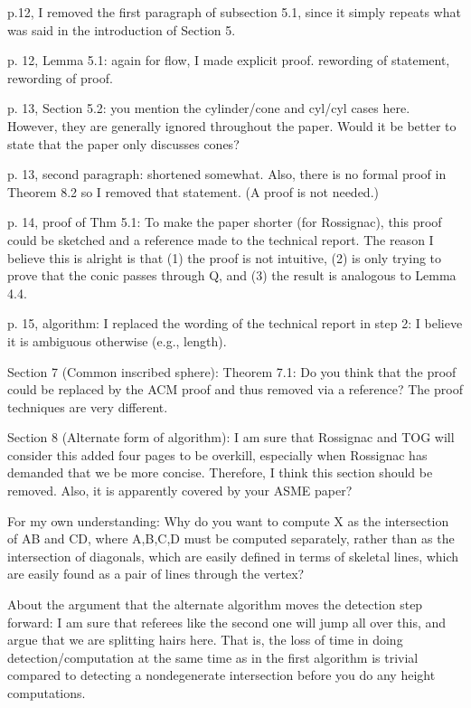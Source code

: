 p.12, I removed the first paragraph of subsection 5.1, since it simply repeats
	what was said in the introduction of Section 5.

p. 12, Lemma 5.1: again for flow, I made explicit proof.
	rewording of statement, rewording of proof.

p. 13, Section 5.2: you mention the cylinder/cone and cyl/cyl cases here.
	However, they are generally ignored throughout the paper.
	Would it be better to state that the paper only discusses cones?

p. 13, second paragraph: shortened somewhat.
	Also, there is no formal proof in Theorem 8.2 so I removed that
	statement.  (A proof is not needed.)

p. 14, proof of Thm 5.1: To make the paper shorter (for Rossignac),
	this proof could be sketched and a reference made to the technical
	report.  The reason I believe this is alright is that
	(1) the proof is not intuitive, (2) is only trying to prove that
	the conic passes through Q, and (3) the result is analogous to 
	Lemma 4.4.

p. 15, algorithm: I replaced the wording of the technical report in step 2:
	I believe it is ambiguous otherwise (e.g., length).


Section 7 (Common inscribed sphere): 
	Theorem 7.1: Do you think that the proof could be replaced by
	the ACM proof and thus removed via a reference?
	The proof techniques are very different.

Section 8 (Alternate form of algorithm): 
	I am sure that Rossignac and TOG will
	consider this added four pages to be overkill, especially
	when Rossignac has demanded that we be more concise.
	Therefore, I think this section should be removed.
	Also, it is apparently covered by your ASME paper?

	For my own understanding: 
	Why do you want to compute X as the intersection of AB and CD,
	where A,B,C,D must be computed separately,
	rather than as the intersection of diagonals,
	which are easily defined in terms of skeletal lines,
	which are easily found as a pair of lines through the vertex?

	About the argument that the alternate algorithm moves the
	detection step forward:
	I am sure that referees like the second one will jump all over this,
	and argue that we are splitting hairs here.
	That is, the loss of time in doing detection/computation at the
	same time as in the first algorithm is trivial compared to
	detecting a nondegenerate intersection before you do any height
	computations.

